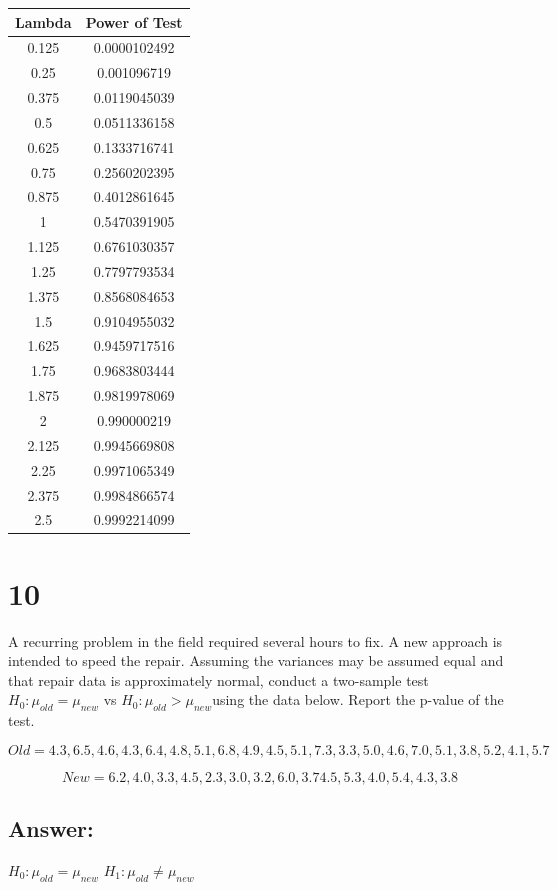 \documentclass[svgnames]{article}
\begin{document}
\begin{center}
\begin{tabular}{| c | c |} 
\hline
Lambda & Power of Test\\
\hline
 0.125&0.0000102492\\
0.25&0.001096719\\
0.375&0.0119045039\\
0.5&0.0511336158\\
0.625&0.1333716741\\
0.75&0.2560202395\\
0.875&0.4012861645\\
1&0.5470391905\\
1.125&0.6761030357\\
1.25&0.7797793534\\
1.375&0.8568084653\\
1.5&0.9104955032\\
1.625&0.9459717516\\
1.75&0.9683803444\\
1.875&0.9819978069\\
2&0.990000219\\
2.125&0.9945669808\\
2.25&0.9971065349\\
2.375&0.9984866574\\
2.5&0.9992214099\\
\hline
\end{tabular}
\end{center}


\section*{10}
A recurring problem in the field required several hours to fix. A new approach is intended to speed the repair. Assuming the variances may be assumed equal and that repair data is approximately normal, conduct a two-sample test  $H_0: \mu_{old} = \mu_{new}$ vs $H_0: \mu_{old} > \mu_{new}$using the data below. Report the p-value of the test.


$$Old = 4.3, 6.5, 4.6, 4.3, 6.4, 4.8, 5.1, 6.8, 4.9, 4.5, 5.1, 7.3, 3.3, 5.0, 4.6, 7.0, 5.1, 3.8, 5.2, 4.1, 5.7$$

$$New = 6.2, 4.0, 3.3, 4.5, 2.3, 3.0, 3.2, 6.0, 3.7 4.5, 5.3, 4.0, 5.4, 4.3, 3.8$$

\subsection*{Answer:}
$H_0: \mu_{old}=\mu_{new}$
\newline
$H_1: \mu_{old} \neq \mu_{new}$
\end{document}
